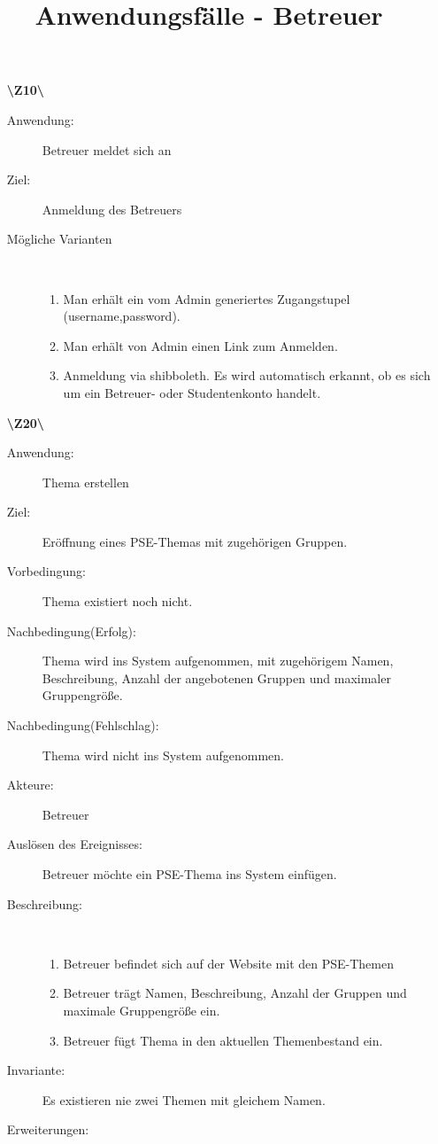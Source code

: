 \documentclass[a4paper]{article}
\begin{document}
\title{\large Anwendungsfälle - Betreuer}
\author{ }
\maketitle
\pagebreak

\begin{enumerate}%
  
  \item[\textbf{\textbackslash Z10\textbackslash}] 
	 \begin{description}
		\item[Anwendung:] Betreuer meldet sich an
  		\item[Ziel:] Anmeldung des Betreuers
  		\item[Mögliche Varianten]~
  		\begin{enumerate}[1.]
  			\item Man erhält ein vom Admin generiertes Zugangstupel 		(username,password).
  			\item Man erhält von Admin einen Link zum Anmelden.
  			\item Anmeldung via shibboleth. Es wird automatisch erkannt, ob es sich um ein Betreuer- oder Studentenkonto handelt.
  		\end{enumerate}
  	\end{description}
  \pagebreak
  \item[\textbf{\textbackslash Z20\textbackslash}]
	\begin{description}
  		\item[Anwendung:] Thema erstellen
  		\item[Ziel:] Eröffnung eines PSE-Themas mit zugehörigen Gruppen.
  		\item[Vorbedingung:] Thema existiert noch nicht.
  		\item[Nachbedingung(Erfolg):] Thema wird ins System aufgenommen, mit zugehörigem Namen, Beschreibung, Anzahl der angebotenen Gruppen und maximaler Gruppengröße.
  		\item[Nachbedingung(Fehlschlag):] Thema wird nicht ins System aufgenommen.
  		\item[Akteure:] Betreuer
  		\item[Auslösen des Ereignisses:] Betreuer möchte ein PSE-Thema ins System einfügen.
  		\item[Beschreibung:]~
  	\begin{enumerate}[1.]
  	  \item Betreuer befindet sich auf der Website mit den PSE-Themen
  	  \item Betreuer trägt Namen, Beschreibung, Anzahl der Gruppen und maximale Gruppengröße ein.
  	  \item Betreuer fügt Thema in den aktuellen Themenbestand ein.
  	\end{enumerate}
  	\item[Invariante:] Es existieren nie zwei Themen mit gleichem Namen.
  	\item[Erweiterungen:]
  \end{description}


\end{enumerate}
\end{document}
